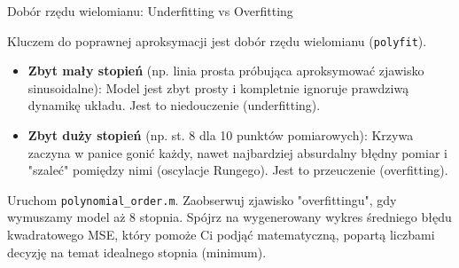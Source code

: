 \documentclass[11pt,aspectratio=169,table]{beamer}
\begin{document}
\begin{frame}{Dobór rzędu wielomianu: Underfitting vs Overfitting}
			\vspace{-0.9em}
	\begin{tcolorbox}[colback=purple!5!white,colframe=purple!75!black,title=Zrozumienie błędu dopasowania]
		Kluczem do poprawnej aproksymacji jest dobór rzędu wielomianu (\texttt{polyfit}). 
		\begin{itemize}
			\item \textbf{Zbyt mały stopień} (np. linia prosta próbująca aproksymować zjawisko sinusoidalne): Model jest zbyt prosty i kompletnie ignoruje prawdziwą dynamikę układu. Jest to \alert{niedouczenie (underfitting)}.
			\item \textbf{Zbyt duży stopień} (np. st. 8 dla 10 punktów pomiarowych): Krzywa zaczyna w panice gonić każdy, nawet najbardziej absurdalny błędny pomiar i "szaleć" pomiędzy nimi (oscylacje Rungego). Jest to \alert{przeuczenie (overfitting)}.
		\end{itemize}
	\end{tcolorbox}
	\vspace{-1.2em}
	\begin{tcolorbox}[colback=white,colframe=black,title=Weryfikacja rzędu zjawiska]
		Uruchom \texttt{polynomial\_order.m}. Zaobserwuj zjawisko "overfittingu", gdy wymuszamy model aż 8 stopnia. Spójrz na wygenerowany wykres średniego błędu kwadratowego MSE, który pomoże Ci podjąć matematyczną, popartą liczbami decyzję na temat idealnego stopnia (minimum).
	\end{tcolorbox}
\end{frame}
\end{document}
